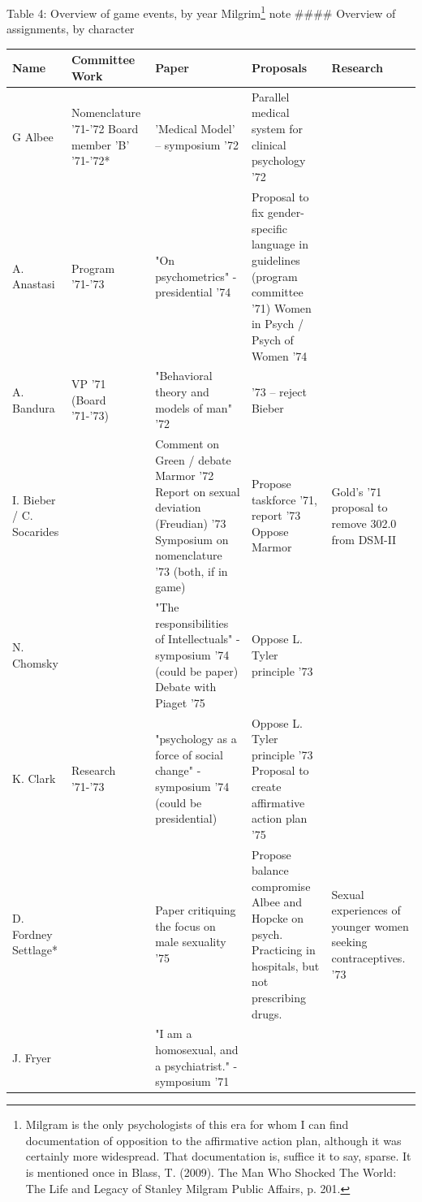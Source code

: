 Table 4: Overview of game events, by year
 Milgrim\footnote{Milgram is the only psychologists of this era for whom I can find documentation of opposition to the affirmative action plan, although it was certainly more widespread. That documentation is, suffice it to say, sparse. It is mentioned once in Blass, T. (2009). The Man Who Shocked The World: The Life and Legacy of Stanley Milgram Public Affairs, p. 201.} note
 \#\#\#\# Overview of assignments, by character
 \begin{longtable}[!t]{ | p{1cm} | p{2cm} | p{6cm} | p{3cm} | p{3cm} | }
\hline
Name&
Committee Work&
Paper&
Proposals&
Research\\ \hline
G Albee&
Nomenclature '71-'72 \newline
Board member 'B' '71-'72*&
'Medical Model' – symposium '72&
Parallel medical system for clinical psychology '72&
\\
A. Anastasi&
Program '71-'73&
"On psychometrics" - presidential '74&
Proposal to fix gender-specific language in guidelines (program committee '71)
Women in Psych / Psych of Women '74&
\\
A. Bandura&
VP '71\newline
(Board '71-'73)&
"Behavioral theory and models of man" '72&
'73 – reject Bieber&
\\
I. Bieber /
C. Socarides&
&
Comment on Green / debate Marmor '72\newline
Report on sexual deviation (Freudian) '73
Symposium on nomenclature '73 (both, if in game)&
Propose taskforce '71, report '73\newline
Oppose Marmor & Gold's '71 proposal to remove 302.0 from DSM-II\\
N. Chomsky&
&
"The responsibilities of Intellectuals" - symposium '74 (could be paper)\newline
Debate with Piaget '75&
Oppose L. Tyler principle '73&
\\
K. Clark&
Research '71-'73&
"psychology as a force of social change" - symposium '74 (could be presidential)&
Oppose L. Tyler principle '73\newline
Proposal to create affirmative action plan '75&
\\
D. Fordney Settlage*&
&
Paper critiquing the focus on male sexuality '75&
Propose balance compromise Albee and Hopcke on psych. \newline Practicing in hospitals, but not prescribing drugs. &
Sexual experiences of younger women seeking contraceptives. '73\\
J. Fryer&
&
"I am a homosexual, and a psychiatrist." - symposium '71&

\end{longtable}
